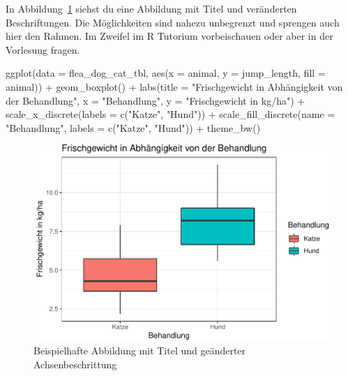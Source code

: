\documentclass[
  letterpaper,
  DIV=11,
  oneside]{scrreport}
\newenvironment{Shaded}{\begin{snugshade}}{\end{snugshade}}
\newcommand{\AttributeTok}[1]{\textcolor[rgb]{0.40,0.45,0.13}{#1}}
\newcommand{\FunctionTok}[1]{\textcolor[rgb]{0.28,0.35,0.67}{#1}}
\newcommand{\NormalTok}[1]{\textcolor[rgb]{0.00,0.23,0.31}{#1}}
\newcommand{\SpecialCharTok}[1]{\textcolor[rgb]{0.37,0.37,0.37}{#1}}
\newcommand{\StringTok}[1]{\textcolor[rgb]{0.13,0.47,0.30}{#1}}
\begin{document}
{}

In Abbildung~\ref{fig-labels-0} siehst du eine Abbildung mit Titel und
veränderten Beschriftungen. Die Möglichkeiten sind nahezu unbegrenzt und
sprengen auch hier den Rahmen. Im Zweifel im R Tutorium vorbeischauen
oder aber in der Vorlesung fragen.

\begin{Shaded}
\begin{Highlighting}[]
\FunctionTok{ggplot}\NormalTok{(}\AttributeTok{data =}\NormalTok{ flea\_dog\_cat\_tbl, }\FunctionTok{aes}\NormalTok{(}\AttributeTok{x =}\NormalTok{ animal, }\AttributeTok{y =}\NormalTok{ jump\_length,}
                                    \AttributeTok{fill =}\NormalTok{ animal)) }\SpecialCharTok{+}
  \FunctionTok{geom\_boxplot}\NormalTok{() }\SpecialCharTok{+}
  \FunctionTok{labs}\NormalTok{(}\AttributeTok{title =} \StringTok{"Frischgewicht in Abhängigkeit von der Behandlung"}\NormalTok{,}
       \AttributeTok{x =} \StringTok{"Behandlung"}\NormalTok{, }\AttributeTok{y =} \StringTok{"Frischgewicht in kg/ha"}\NormalTok{) }\SpecialCharTok{+}
  \FunctionTok{scale\_x\_discrete}\NormalTok{(}\AttributeTok{labels =} \FunctionTok{c}\NormalTok{(}\StringTok{"Katze"}\NormalTok{, }\StringTok{"Hund"}\NormalTok{)) }\SpecialCharTok{+}
  \FunctionTok{scale\_fill\_discrete}\NormalTok{(}\AttributeTok{name =} \StringTok{"Behandlung"}\NormalTok{, }\AttributeTok{labels =} \FunctionTok{c}\NormalTok{(}\StringTok{"Katze"}\NormalTok{, }\StringTok{"Hund"}\NormalTok{)) }\SpecialCharTok{+}
  \FunctionTok{theme\_bw}\NormalTok{() }
\end{Highlighting}
\end{Shaded}

\begin{figure}[H]

{\centering \includegraphics{./eda-ggplot_files/figure-pdf/fig-labels-0-1.pdf}

}

\caption{\label{fig-labels-0}Beispielhafte Abbildung mit Titel und
geänderter Achsenbeschrittung}

\end{figure}
\end{document}
